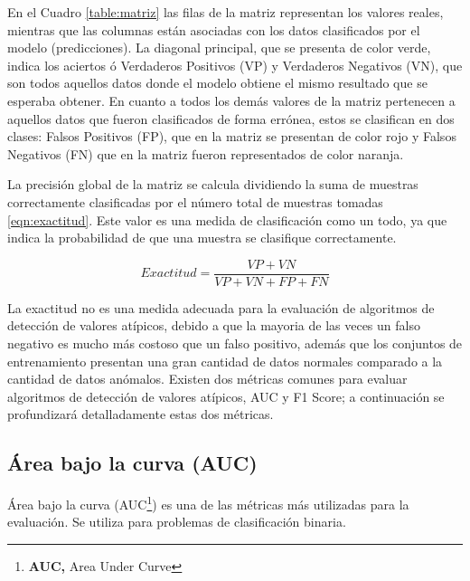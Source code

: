 \vspace{5mm} %

En el Cuadro \ref{table:matriz} las filas de la matriz representan los valores reales, mientras que las columnas est\'{a}n asociadas con los datos clasificados por el modelo (predicciones). La diagonal principal, que se presenta de color verde, indica los aciertos \'{o} Verdaderos Positivos (VP) y Verdaderos Negativos (VN), que son todos aquellos datos donde el modelo obtiene el mismo resultado que se esperaba obtener. En cuanto a todos los dem\'{a}s valores de la matriz pertenecen a aquellos datos que fueron clasificados de forma err\'{o}nea, estos se clasifican en dos clases: Falsos Positivos (FP), que en la matriz se presentan de color rojo y Falsos Negativos (FN) que en la matriz fueron representados de color naranja.

\vspace{5mm} %



La precisi\'{o}n global de la matriz se calcula dividiendo la suma de muestras correctamente clasificadas por el n\'{u}mero total de muestras tomadas \ref{eqn:exactitud}. Este valor es una medida de clasificaci\'{o}n como un todo, ya que indica la probabilidad de que una muestra se clasifique correctamente.

\begin{equation}
Exactitud=\frac{VP+VN}{VP+VN+FP+FN}
\label{eqn:exactitud}
\end{equation}

La exactitud no es una medida adecuada para la evaluaci\'{o}n de algoritmos de detecci\'{o}n de valores at\'{i}picos, debido a que la mayoria de las veces un falso negativo es mucho m\'{a}s costoso que un falso positivo, adem\'{a}s que los conjuntos de entrenamiento presentan una gran cantidad de datos normales comparado a la cantidad de datos an\'{o}malos. Existen dos m\'{e}tricas comunes para evaluar algoritmos de detecci\'{o}n de valores at\'{i}picos, AUC y F1 Score; a continuaci\'{o}n se profundizar\'{a} detalladamente estas dos m\'{e}tricas.

\subsection{\'{A}rea bajo la curva (AUC)}

\'{A}rea bajo la curva (AUC\footnote{\textbf{AUC, }Area Under Curve}) es una de las m\'{e}tricas m\'{a}s utilizadas para la evaluaci\'{o}n. Se utiliza para problemas de clasificaci\'{o}n binaria.

